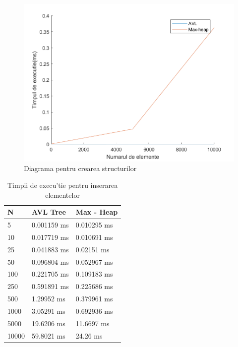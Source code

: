 \begin{figure}[ht]
\centering
\includegraphics[scale=0.8]{Fisiere/creare}
\caption {Diagrama pentru crearea structurilor}
\end{figure}
\FloatBarrier

\begin{table}[ht]
\centering
\caption{Timpii de execu'tie pentru inserarea elementelor}
\begin{tabular}{| p{5cm} | p{5cm} | p{5cm} |}
\hline
N & AVL Tree & Max - Heap \\
\hline\hline
5 & 0.001159 ms & 0.010295 ms \\
\hline
10 & 0.017719 ms & 0.010691 ms \\
\hline
25 & 0.041883 ms & 0.02151 ms \\
\hline
50 & 0.096804 ms & 0.052967 ms \\
\hline
100 & 0.221705 ms & 0.109183 ms \\
\hline
250 & 0.591891 ms & 0.225686 ms \\
\hline
500 & 1.29952 ms & 0.379961 ms \\
\hline
1000 & 3.05291 ms & 0.692936 ms \\
\hline
5000 & 19.6206 ms & 11.6697 ms \\
\hline
10000 & 59.8021 ms & 24.26 ms \\
\hline
\end{tabular}
\end{table}
\FloatBarrier

